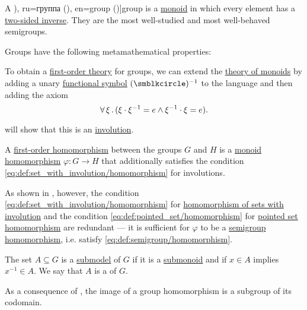 \begin{definition}\label{def:group}
  A \term[bg=група (\cite[4]{КоцевСидеров2016}), ru=группа (\cite[sec. 2.6]{Тыртышников2007}), en=group (\cite[118]{Knapp2016BasicAlgebra})]{group} is a \hyperref[def:monoid]{monoid} in which every element has a \hyperref[def:monoid_inverse]{two-sided inverse}. They are the most well-studied and most well-behaved semigroups.

  Groups have the following metamathematical properties:
  \begin{thmenum}
     To obtain a \hyperref[def:first_order_theory]{first-order theory} for groups, we can extend the \hyperref[def:monoid/theory]{theory of monoids} by adding a unary \hyperref[def:first_order_language/fun]{functional symbol} \( (\anon)^{-1} \) to the language and then adding the axiom
    \begin{equation}\label{eq:def:group/theory/inverse_axiom}
      \forall \thinspace \xi \thinspace . \thinspace (\xi \cdot \xi^{-1} = e \wedge \xi^{-1} \cdot \xi = e).
    \end{equation}

     will show that this is an \hyperref[def:involution]{involution}.

     A \hyperref[def:first_order_homomorphism]{first-order homomorphism} between the groups \( G \) and \( H \) is a \hyperref[def:monoid/homomorphism]{monoid homomorphism} \( \varphi: G \to H \) that additionally satisfies the condition \eqref{eq:def:set_with_involution/homomorphism} for involutions.

    As shown in , however, the condition \eqref{eq:def:set_with_involution/homomorphism} for \hyperref[def:set_with_involution/homomorphism]{homomorphism of sets with involution} and the condition \eqref{eq:def:pointed_set/homomorphism} for \hyperref[def:pointed_set/homomorphism]{pointed set homomorphism} are redundant --- it is sufficient for \( \varphi \) to be a \hyperref[def:semigroup/homomorphism]{semigroup homomorphism}, i.e. satisfy \eqref{eq:def:semigroup/homomorphism}.

     The set \( A \subseteq G \) is a \hyperref[def:first_order_submodel]{submodel} of \( G \) if it is a \hyperref[def:monoid/submodel]{submonoid} and if \( x \in A \) implies \( x^{-1} \in A \). We say that \( A \) is a  of \( G \).

    As a consequence of , the image of a group homomorphism is a subgroup of its codomain.


\end{thmenum}
\end{definition}
